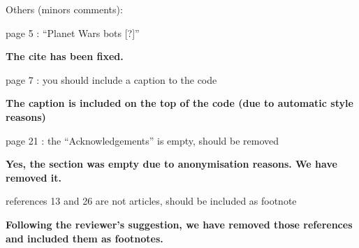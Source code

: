 \documentclass{article}
\begin{document}
Others (minors comments):

page 5 : ``Planet Wars bots [?]''

\vspace{0.5cm} \textbf{The cite has been fixed.} \vspace{0.5cm}

 page 7 : you should include a caption to the code

\vspace{0.5cm} \textbf{The caption is included on the top of the code (due to automatic style reasons)} \vspace{0.5cm}

 page 21 : the ``Acknowledgements'' is empty, should be removed

\vspace{0.5cm} \textbf{ Yes, the section was empty due to anonymisation reasons. We have removed it.} \vspace{0.5cm}

 references 13 and 26 are not articles, should be included as footnote

\vspace{0.5cm} \textbf{ Following the reviewer's suggestion, we have removed those references and included them as footnotes.} \vspace{0.5cm}
\end{document}
